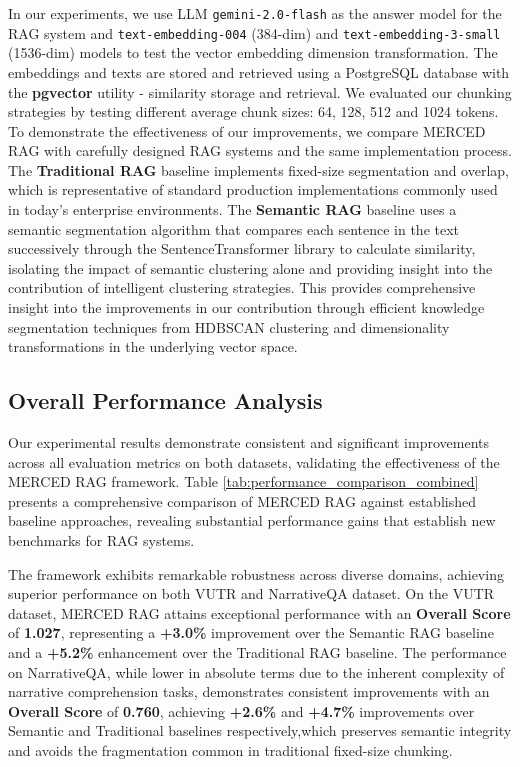 \documentclass[10pt,twocolumn,letterpaper]{article}
\begin{document}
\vspace{0.5em}
In our experiments, we use LLM \texttt{gemini-2.0-flash} as the answer model for the RAG system and \texttt{text-embedding-004} (384-dim) and \texttt{text-embedding-3-small} (1536-dim) models to test the vector embedding dimension transformation. The embeddings and texts are stored and retrieved using a PostgreSQL database with the \textbf{pgvector} utility - similarity storage and retrieval. We evaluated our chunking strategies by testing different average chunk sizes: 64, 128, 512 and 1024 tokens. To demonstrate the effectiveness of our improvements, we compare MERCED RAG with carefully designed RAG systems and the same implementation process. The \textbf{Traditional RAG} baseline implements fixed-size segmentation and overlap, which is representative of standard production implementations commonly used in today's enterprise environments. The \textbf{Semantic RAG} baseline uses a semantic segmentation algorithm that compares each sentence in the text successively through the SentenceTransformer library to calculate similarity, isolating the impact of semantic clustering alone and providing insight into the contribution of intelligent clustering strategies. This provides comprehensive insight into the improvements in our contribution through efficient knowledge segmentation techniques from HDBSCAN clustering and dimensionality transformations in the underlying vector space.


\subsection{Overall Performance Analysis}

Our experimental results demonstrate consistent and significant improvements across all evaluation metrics on both datasets, validating the effectiveness of the MERCED RAG framework. Table \ref{tab:performance_comparison_combined} presents a comprehensive comparison of MERCED RAG against established baseline approaches, revealing substantial performance gains that establish new benchmarks for RAG systems.

\vspace{0.5em} 
The framework exhibits remarkable robustness across diverse domains, achieving superior performance on both  VUTR and NarrativeQA dataset. On the VUTR dataset, MERCED RAG attains exceptional performance with an \textbf{Overall Score} of \textbf{1.027}, representing a \textbf{+3.0\%} improvement over the Semantic RAG baseline and a \textbf{+5.2\%} enhancement over the Traditional RAG baseline. The performance on NarrativeQA, while lower in absolute terms due to the inherent complexity of narrative comprehension tasks, demonstrates consistent improvements with an \textbf{Overall Score} of \textbf{0.760}, achieving \textbf{+2.6\%} and \textbf{+4.7\%} improvements over Semantic and Traditional baselines respectively,which preserves semantic integrity and avoids the fragmentation common in traditional fixed-size chunking.
\end{document}
